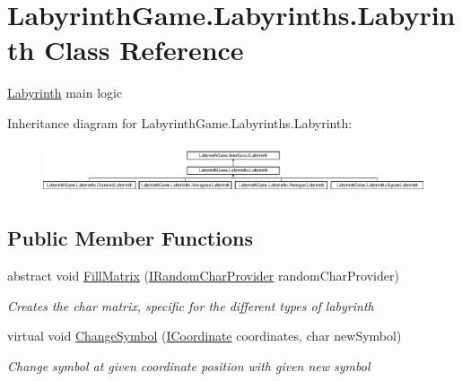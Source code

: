 \hypertarget{class_labyrinth_game_1_1_labyrinths_1_1_labyrinth}{\section{Labyrinth\+Game.\+Labyrinths.\+Labyrinth Class Reference}
\label{class_labyrinth_game_1_1_labyrinths_1_1_labyrinth}
}


\hyperlink{class_labyrinth_game_1_1_labyrinths_1_1_labyrinth}{Labyrinth} main logic  


Inheritance diagram for Labyrinth\+Game.\+Labyrinths.\+Labyrinth\+:\begin{figure}[H]
\begin{center}
\leavevmode
\includegraphics[height=1.473684cm]{class_labyrinth_game_1_1_labyrinths_1_1_labyrinth}
\end{center}
\end{figure}
\subsection*{Public Member Functions}
\begin{DoxyCompactItemize}
\item 
abstract void \hyperlink{class_labyrinth_game_1_1_labyrinths_1_1_labyrinth_a13b3599b7157943b1c028b2f0f5df26c}{Fill\+Matrix} (\hyperlink{interface_labyrinth_game_1_1_interfaces_1_1_i_random_char_provider}{I\+Random\+Char\+Provider} random\+Char\+Provider)
\begin{DoxyCompactList}\small\item\em Creates the char matrix, specific for the different types of labyrinth \end{DoxyCompactList}\item 
virtual void \hyperlink{class_labyrinth_game_1_1_labyrinths_1_1_labyrinth_ac58bba974fe6e9362002b57fbf9816bb}{Change\+Symbol} (\hyperlink{interface_labyrinth_game_1_1_interfaces_1_1_i_coordinate}{I\+Coordinate} coordinates, char new\+Symbol)
\begin{DoxyCompactList}\small\item\em Change symbol at given coordinate position with given new symbol \end{DoxyCompactList}\end{DoxyCompactItemize}
